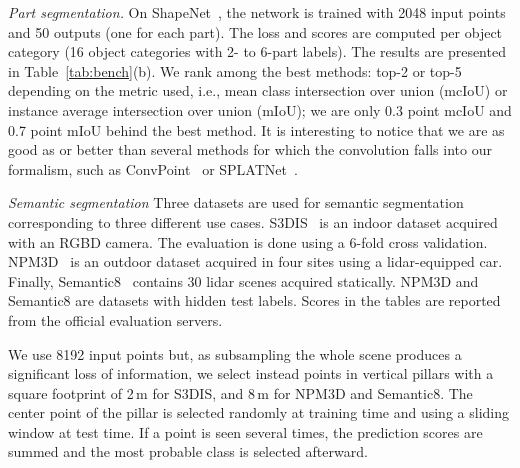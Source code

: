 \textit{Part segmentation.}
On ShapeNet~\cite{yi2016scalable}, the network is trained with 2048 input points and 50 outputs (one for each part). The loss and scores are computed per object category (16 object categories with 2- to 6-part labels).
The results are presented in Table~\ref{tab:bench}(b).
We rank among the best methods: top-2 or top-5 depending on the metric used, i.e., mean class intersection over union (mcIoU) or instance average intersection over union (mIoU); we are only 0.3 point mcIoU and 0.7 point mIoU behind the best method.
It is interesting to notice that we are as good as or better than several methods for which the convolution falls into our formalism, such as ConvPoint~\cite{boulch2020convpoint} or SPLATNet~\cite{su2018splatnet}.


\textit{Semantic segmentation}
Three datasets are used for semantic segmentation corresponding to three different use cases.
S3DIS~\cite{armeni20163d} is an indoor dataset acquired with an RGBD camera.
The evaluation is done using a 6-fold cross validation.
NPM3D~\cite{roynard2018paris} is an outdoor dataset acquired in four sites using a lidar-equipped car.
Finally, Semantic8~\cite{hackel2017isprs} contains 30 lidar scenes acquired statically.
NPM3D and Semantic8 are datasets with hidden test labels. Scores in the tables are reported from the official evaluation servers.

We use 8192 input points but, as
subsampling the whole scene produces a significant loss of information,
we select instead points in vertical pillars with a square footprint of 2\,m for S3DIS, and 8\,m for NPM3D and Semantic8.
The center point of the pillar is selected randomly at training time and using a sliding window at test time.
If a point is seen several times, the prediction scores are summed and the most probable class is selected afterward.

